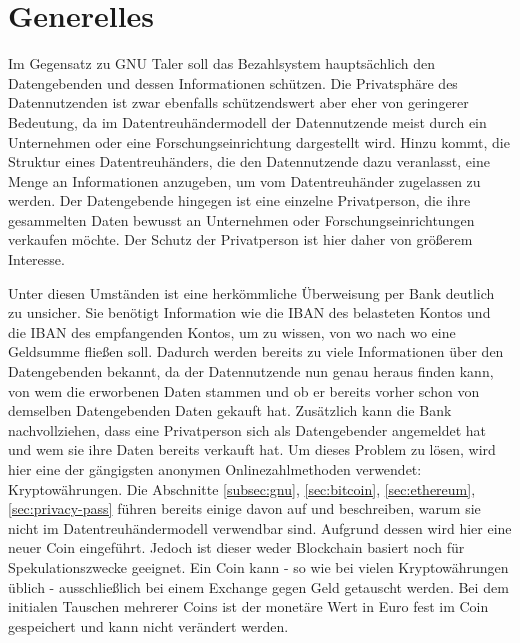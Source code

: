\documentclass{scrreprt}
\begin{document}
 

\section{Generelles}
Im Gegensatz zu GNU Taler soll das Bezahlsystem hauptsächlich den Datengebenden und dessen Informationen schützen. Die Privatsphäre des Datennutzenden ist zwar ebenfalls schützendswert aber eher von geringerer Bedeutung, da im Datentreuhändermodell der Datennutzende meist durch ein Unternehmen oder eine Forschungseinrichtung dargestellt wird. Hinzu kommt, die Struktur eines Datentreuhänders, die den Datennutzende dazu veranlasst, eine Menge an Informationen anzugeben, um vom Datentreuhänder zugelassen zu werden. Der Datengebende hingegen ist eine einzelne Privatperson, die ihre gesammelten Daten bewusst an Unternehmen oder Forschungseinrichtungen verkaufen möchte. Der Schutz der Privatperson ist hier daher von größerem Interesse. 

Unter diesen Umständen ist eine herkömmliche Überweisung per Bank deutlich zu unsicher. Sie benötigt Information wie die IBAN des belasteten Kontos und die IBAN des empfangenden Kontos, um zu wissen, von wo nach wo eine Geldsumme fließen soll. Dadurch werden bereits zu viele Informationen über den Datengebenden bekannt, da der Datennutzende nun genau heraus finden kann, von wem die erworbenen Daten stammen und ob er bereits vorher schon von demselben Datengebenden Daten gekauft hat. Zusätzlich kann die Bank nachvollziehen, dass eine Privatperson sich als Datengebender angemeldet hat und wem sie ihre Daten bereits verkauft hat.
Um dieses Problem zu lösen, wird hier eine der gängigsten anonymen Onlinezahlmethoden verwendet: Kryptowährungen. Die Abschnitte \ref{subsec:gnu}, \ref{sec:bitcoin}, \ref{sec:ethereum}, \ref{sec:privacy-pass} führen bereits einige davon auf und beschreiben, warum sie nicht im Datentreuhändermodell verwendbar sind. Aufgrund dessen wird hier eine neuer Coin eingeführt. Jedoch ist dieser weder Blockchain basiert noch für Spekulationszwecke geeignet. Ein Coin kann - so wie bei vielen Kryptowährungen üblich - ausschließlich bei einem Exchange gegen Geld getauscht werden. Bei dem initialen Tauschen mehrerer Coins ist der monetäre Wert in Euro fest im Coin gespeichert und kann nicht verändert werden. 
\end{document}
